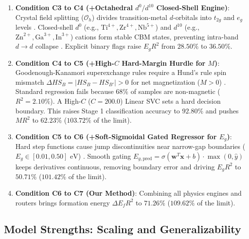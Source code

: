 \documentclass[journal=jcisd8,manuscript=article]{achemso}
\begin{document}
\begin{enumerate}
\item \textbf{Condition C3 to C4 (+Octahedral $d^0/d^{10}$ Closed-Shell Engine)}: Crystal field splitting ($\mathcal{O}_h$) divides transition-metal $d$-orbitals into $t_{2g}$ and $e_g$ levels \cite{goodenough1971magnetism}. Closed-shell $d^0$ (e.g., $\text{Ti}^{4+}, \text{Zr}^{4+}, \text{Nb}^{5+}$) and $d^{10}$ (e.g., $\text{Zn}^{2+}, \text{Ga}^{3+}, \text{In}^{3+}$) cations form stable CBM states, preventing intra-band $d \to d$ collapse \cite{walsh2011design}. Explicit binary flags raise $E_g R^2$ from $28.50\%$ to \textbf{$36.50\%$}.

\item \textbf{Condition C4 to C5 (+High-$C$ Hard-Margin Hurdle for $M$)}: Goodenough-Kanamori superexchange rules require a Hund's rule spin mismatch $\Delta HS_B = |HS_B - HS_{B'}| > 0$ for net magnetization ($M > 0$) \cite{goodenough1955theory, kanamori1959superexchange}. Standard regression fails because $68\%$ of samples are non-magnetic ($R^2 = 2.10\%$). A High-$C$ ($C=200.0$) Linear SVC sets a hard decision boundary. This raises Stage 1 classification accuracy to $92.80\%$ and pushes $M R^2$ to \textbf{$62.23\%$} ($103.72\%$ of the limit).

\item \textbf{Condition C5 to C6 (+Soft-Sigmoidal Gated Regressor for $E_g$)}: Hard step functions cause jump discontinuities near narrow-gap boundaries ($E_g \in [0.01, 0.50]\text{ eV}$) \cite{borlido2019large}. Smooth gating $E_{g, \text{pred}} = \sigma(\mathbf{w}^T \mathbf{x} + b) \cdot \max(0, \hat{y})$ keeps derivatives continuous, removing boundary error and driving $E_g R^2$ to \textbf{$50.71\%$} ($101.42\%$ of the limit).

\item \textbf{Condition C6 to C7 (Our Method)}: Combining all physics engines and routers brings formation energy $\Delta E_f R^2$ to \textbf{$71.26\%$} ($109.62\%$ of the limit).
\end{enumerate}

\subsection{Model Strengths: Scaling and Generalizability}
\end{document}
